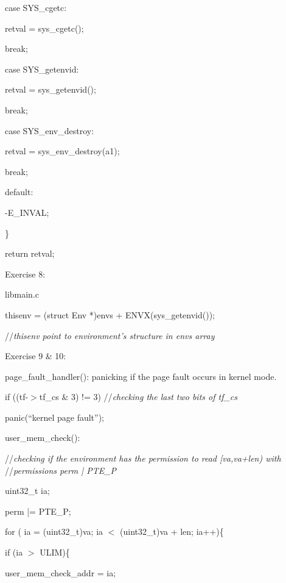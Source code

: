 \documentclass[a4paper,portrait,12pt]{article}
\begin{document}
		case SYS\_cgetc:


			retval = sys\_cgetc();


			break;


		case SYS\_getenvid:


			retval = sys\_getenvid();


			break;


		case SYS\_env\_destroy:


			retval = sys\_env\_destroy(a1);


			break;


		default:


			-E\_INVAL;


			\}


		return retval;





Exercise 8:


libmain.c





	thisenv = (struct Env *)envs + ENVX(sys\_getenvid());


	//\emph{thisenv point to environment's structure in envs array}





Exercise 9 \& 10:





page\_fault\_handler(): panicking if the page fault occurs in kernel mode.





if ((tf-$>$tf\_cs \& 3) != 3)  //\emph{checking the last two bits of tf\_cs}


	panic({``}kernel page fault'');





user\_mem\_check():





	//\emph{checking if the environment has the permission to read [va,va+len) with} 	//\emph{permissions perm | PTE\_P}


	uint32\_t  ia;


	perm |= PTE\_P;


	for (  ia = (uint32\_t)va; ia $<$ (uint32\_t)va + len; ia++)\{


		if (ia $>$ ULIM)\{


			user\_mem\_check\_addr = ia;
\end{document}

